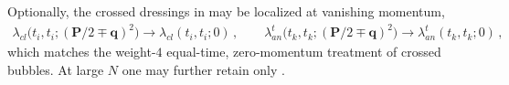 \documentclass[reprint,english,superscriptaddress,preprintnumbers,amsmath,amssymb,aps,prd]{revtex4-1}
\begin{document}
Optionally, the crossed dressings in  may be localized at vanishing momentum,
\begin{align}
    \lambda_{cl}\bigl(t_i,t_i;(\boldsymbol{P}/2\mp\boldsymbol{q})^{2}\bigr)\to\lambda_{cl}(t_i,t_i;0)\,,\qquad
    \lambda_{an}^{t}\bigl(t_k,t_k;(\boldsymbol{P}/2\mp\boldsymbol{q})^{2}\bigr)\to\lambda_{an}^{t}(t_k,t_k;0)\,,
    \label{eq:cross-local}
\end{align}
which matches the weight-$4$ equal-time, zero-momentum treatment of crossed bubbles. At large $N$ one may further retain only .

\hfill
\end{document}
